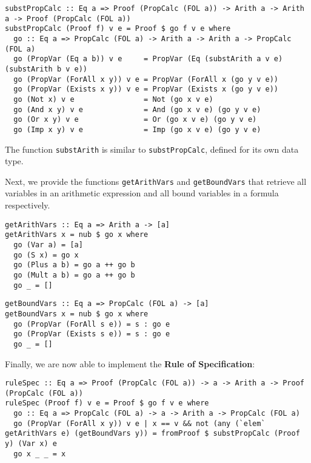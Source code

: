 \documentclass{article}
\begin{document}
\begin{lstlisting}
substPropCalc :: Eq a => Proof (PropCalc (FOL a)) -> Arith a -> Arith a -> Proof (PropCalc (FOL a))
substPropCalc (Proof f) v e = Proof $ go f v e where
  go :: Eq a => PropCalc (FOL a) -> Arith a -> Arith a -> PropCalc (FOL a)
  go (PropVar (Eq a b)) v e     = PropVar (Eq (substArith a v e) (substArith b v e))
  go (PropVar (ForAll x y)) v e = PropVar (ForAll x (go y v e))
  go (PropVar (Exists x y)) v e = PropVar (Exists x (go y v e))
  go (Not x) v e                = Not (go x v e)
  go (And x y) v e              = And (go x v e) (go y v e)
  go (Or x y) v e               = Or (go x v e) (go y v e)
  go (Imp x y) v e              = Imp (go x v e) (go y v e)
\end{lstlisting}

The function \texttt{substArith} is similar to \texttt{substPropCalc}, defined for its own data type.

Next, we provide the functions \texttt{getArithVars} and \texttt{getBoundVars} that retrieve all variables in an arithmetic expression and all bound variables in a formula respectively.

\begin{minipage}{0.49\textwidth}
\begin{lstlisting}
getArithVars :: Eq a => Arith a -> [a]
getArithVars x = nub $ go x where
  go (Var a) = [a]
  go (S x) = go x
  go (Plus a b) = go a ++ go b
  go (Mult a b) = go a ++ go b
  go _ = []
\end{lstlisting}
\end{minipage}
\begin{minipage}{0.49\textwidth}
\begin{lstlisting}
getBoundVars :: Eq a => PropCalc (FOL a) -> [a]
getBoundVars x = nub $ go x where
  go (PropVar (ForAll s e)) = s : go e
  go (PropVar (Exists s e)) = s : go e
  go _ = []
\end{lstlisting}
\end{minipage}

Finally, we are now able to implement the \textbf{Rule of Specification}:

\begin{lstlisting}
ruleSpec :: Eq a => Proof (PropCalc (FOL a)) -> a -> Arith a -> Proof (PropCalc (FOL a))
ruleSpec (Proof f) v e = Proof $ go f v e where
  go :: Eq a => PropCalc (FOL a) -> a -> Arith a -> PropCalc (FOL a)
  go (PropVar (ForAll x y)) v e | x == v && not (any (`elem` getArithVars e) (getBoundVars y)) = fromProof $ substPropCalc (Proof y) (Var x) e
  go x _ _ = x
\end{lstlisting}
\end{document}
